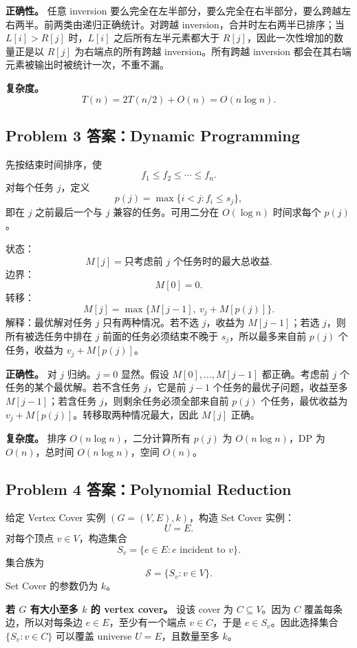 \documentclass[UTF8,a4paper,11pt]{ctexart}
\begin{document}
\textbf{正确性。} 任意 inversion 要么完全在左半部分，要么完全在右半部分，要么跨越左右两半。前两类由递归正确统计。对跨越 inversion，合并时左右两半已排序；当 $L[i]>R[j]$ 时，$L[i]$ 之后所有左半元素都大于 $R[j]$，因此一次性增加的数量正是以 $R[j]$ 为右端点的所有跨越 inversion。所有跨越 inversion 都会在其右端元素被输出时被统计一次，不重不漏。

\textbf{复杂度。}
\[
T(n)=2T(n/2)+O(n)=O(n\log n).
\]

\subsection*{Problem 3 答案：Dynamic Programming}

先按结束时间排序，使
\[
f_1\le f_2\le\cdots\le f_n.
\]
对每个任务 $j$，定义
\[
p(j)=\max\{i<j:f_i\le s_j\},
\]
即在 $j$ 之前最后一个与 $j$ 兼容的任务。可用二分在 $O(\log n)$ 时间求每个 $p(j)$。

状态：
\[
M[j]=\text{只考虑前 }j\text{ 个任务时的最大总收益}.
\]
边界：
\[
M[0]=0.
\]
转移：
\[
M[j]=\max\{M[j-1],\ v_j+M[p(j)]\}.
\]
解释：最优解对任务 $j$ 只有两种情况。若不选 $j$，收益为 $M[j-1]$；若选 $j$，则所有被选任务中排在 $j$ 前面的任务必须结束不晚于 $s_j$，所以最多来自前 $p(j)$ 个任务，收益为 $v_j+M[p(j)]$。

\textbf{正确性。} 对 $j$ 归纳。$j=0$ 显然。假设 $M[0],\ldots,M[j-1]$ 都正确。考虑前 $j$ 个任务的某个最优解。若不含任务 $j$，它是前 $j-1$ 个任务的最优子问题，收益至多 $M[j-1]$；若含任务 $j$，则剩余任务必须全部来自前 $p(j)$ 个任务，最优收益为 $v_j+M[p(j)]$。转移取两种情况最大，因此 $M[j]$ 正确。

\textbf{复杂度。} 排序 $O(n\log n)$，二分计算所有 $p(j)$ 为 $O(n\log n)$，DP 为 $O(n)$，总时间 $O(n\log n)$，空间 $O(n)$。

\subsection*{Problem 4 答案：Polynomial Reduction}

给定 Vertex Cover 实例 $(G=(V,E),k)$，构造 Set Cover 实例：
\[
U=E.
\]
对每个顶点 $v\in V$，构造集合
\[
S_v=\{e\in E:e\text{ incident to }v\}.
\]
集合族为
\[
\mathcal S=\{S_v:v\in V\}.
\]
Set Cover 的参数仍为 $k$。

\textbf{若 $G$ 有大小至多 $k$ 的 vertex cover。} 设该 cover 为 $C\subseteq V$。因为 $C$ 覆盖每条边，所以对每条边 $e\in E$，至少有一个端点 $v\in C$，于是 $e\in S_v$。因此选择集合 $\{S_v:v\in C\}$ 可以覆盖 universe $U=E$，且数量至多 $k$。
\end{document}
